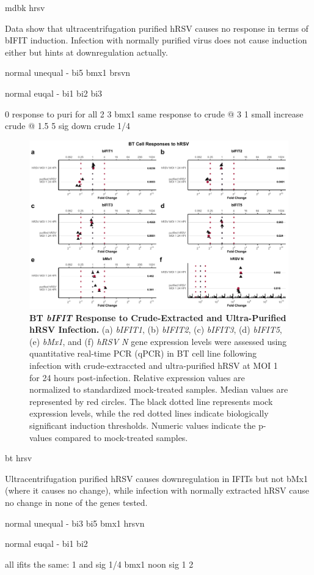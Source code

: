mdbk hrsv

Data show that ultracentrifugation purified hRSV causes no response in terms of bIFIT induction. Infection with normally purified virus does not cause induction either but hints at downregulation actually.

normal unequal - bi5 bmx1 brsvn

normal euqal - bi1 bi2 bi3 

0 response to puri for all
2 3 bmx1 same response to crude @ 3
1 small increase crude @ 1.5
5 sig down crude 1/4


\begin{figure}
    \centering
    \includegraphics[width=1\linewidth]{07. Chapter 2/Figs/02. Induction/10. bt_hrsv.pdf}
    \caption[BT \textit{bIFIT} Response to Crude-Extracted and Ultra-Purified hRSV Infection.]{\textbf{BT \textit{bIFIT} Response to Crude-Extracted and Ultra-Purified hRSV Infection.} (a) \textit{bIFIT1}, (b) \textit{bIFIT2}, (c) \textit{bIFIT3}, (d) \textit{bIFIT5}, (e) \textit{bMx1}, and (f) \textit{hRSV N} gene expression levels were assessed using quantitative real-time PCR (qPCR) in BT cell line following infection with crude-extraccted and ultra-purified hRSV at MOI 1 for 24 hours post-infection. Relative expression values are normalized to standardized mock-treated samples. Median values are represented by red circles. The black dotted line represents mock expression levels, while the red dotted lines indicate biologically significant induction thresholds. Numeric values indicate the p-values compared to mock-treated samples.}
    \label{fig:Bt responses to hRSV}
\end{figure}

bt hrsv

Ultracentrifugation purified hRSV causes downregulation in IFITs but not bMx1 (where it causes no change), while infection with normally extracted hRSV cause no change in none of the genes tested. 

normal unequal - bi3 bi5 bmx1 hrsvn

normal euqal - bi1 bi2

all ifits the same: 1 and sig 1/4
bmx1 noon sig 1 2 